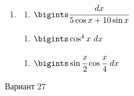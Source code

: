 \documentclass{article}
\begin{document}
\begin{multicols}{2}
\begin{enumerate}[label=\Roman*.]
		\item
		\begin{multicols}{3}
			\begin{enumerate}[label=\arabic*.]
				\setlength\itemsep{1em}
				\item $\bigints\cfrac{dx}{5\cos x + 10 \sin x}$
			\end{enumerate}
			\vfill\null\columnbreak
			\begin{enumerate}[label=\arabic*., start=2]
				\setlength\itemsep{1em}
				\item $\bigints\cos^4x\ dx$
			\end{enumerate}
			\vfill\null\columnbreak
			\begin{enumerate}[label=\arabic*., start=3]
				\setlength\itemsep{1em}
				\item $\bigints\sin\cfrac{x}{2}\cos\cfrac{x}{4}\ dx$
			\end{enumerate}
			\vfill\null\columnbreak
		\end{multicols}
	\end{enumerate}
	
	\vfill\null\columnbreak
	
	\centerline{Вариант 27}
	

\end{multicols}
\end{document}
